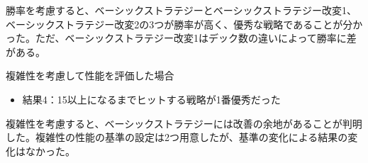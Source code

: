 勝率を考慮すると、ベーシックストラテジーとベーシックストラテジー改変1、ベーシックストラテジー改変2の3つが勝率が高く、優秀な戦略であることが分かった。ただ、ベーシックストラテジー改変1はデック数の違いによって勝率に差がある。

複雑性を考慮して性能を評価した場合
\begin{itemize}
\item 結果4：15以上になるまでヒットする戦略が1番優秀だった
\end{itemize}

複雑性を考慮すると、ベーシックストラテジーには改善の余地があることが判明した。複雑性の性能の基準の設定は2つ用意したが、基準の変化による結果の変化はなかった。

